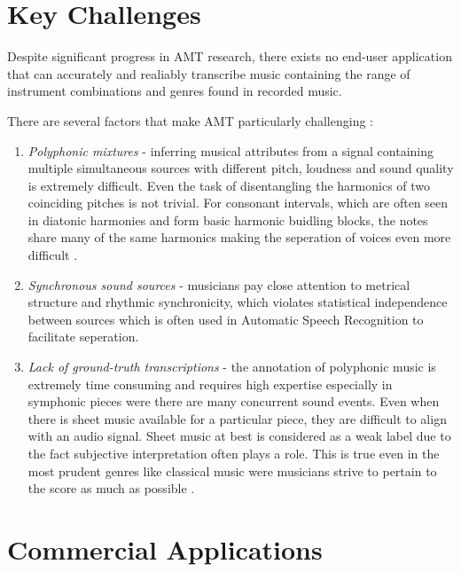 \section{Key Challenges}

Despite significant progress in \ac{AMT} research, there exists no end-user application that
can accurately and realiably transcribe music containing the range of instrument combinations and
genres found in recorded music.

There are several factors that make AMT particularly challenging :

\begin{enumerate}
      \item \emph{Polyphonic mixtures} - inferring musical attributes from a signal containing
            multiple simultaneous sources with different pitch, loudness and sound quality is extremely difficult. Even the
            task of disentangling the harmonics of two coinciding pitches is not trivial. For consonant intervals, which are often
            seen in diatonic harmonies and form basic harmonic buidling blocks, the notes share many of the same harmonics making the
            seperation of voices even more difficult \cite{ISMIR-tut:Benetos}.
      \item \emph{Synchronous sound sources} - musicians pay close attention to metrical structure and rhythmic synchronicity,
            which violates statistical independence between sources which is often used in Automatic Speech Recognition to facilitate seperation.
      \item \emph{Lack of ground-truth transcriptions} - the annotation of polyphonic music
            is extremely time consuming and requires high expertise especially in symphonic pieces were there
            are many concurrent sound events. Even when there is sheet music available for a particular piece, they
            are difficult to align with an audio signal. Sheet music at best is considered as a weak label due to the fact
            subjective interpretation often plays a role. This is true even in the most prudent genres like classical music were musicians strive to pertain to the
            score as much as possible \cite{ground-truths:Su}.
\end{enumerate}

\section{Commercial Applications}

